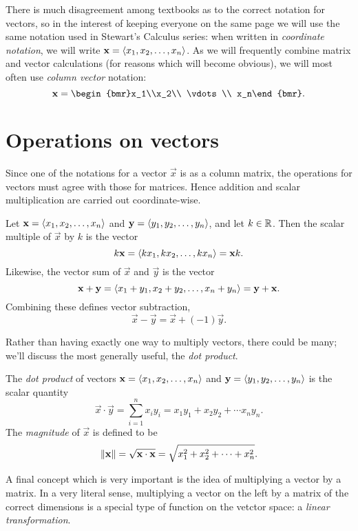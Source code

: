 \documentclass[m3380-lec-main.tex]{subfiles}
\begin{document}
There is much disagreement among textbooks as to the correct notation for vectors, so in the interest of keeping everyone on the same page we will use the same notation used in Stewart's Calculus series: when written in \emph{coordinate notation}, we will write ${\mathbf{x} = \left\langle x_1,x_2,\ldots,x_n\right\rangle}$. As we will frequently combine matrix and vector calculations (for reasons which will become obvious), we will most often use \emph{column vector} notation:
\[\vec{x} = \begin{bmr}x_1\\x_2\\ \vdots \\ x_n\end{bmr}. \]

\section{Operations on vectors}
Since one of the notations for a vector $\vec{x}$ is as a column matrix, the operations for vectors must agree with those for matrices. Hence addition and scalar multiplication are carried out coordinate-wise.

\begin{defn} Let $\mathbf{x}=\left\langle x_1,x_2,\ldots,x_n\right\rangle$ and $\mathbf{y}=\left\langle y_1,y_2,\ldots,y_n\right\rangle$, and let $k\in \mathbb{R}$. Then the scalar multiple of $\vec{x}$ by $k$ is the vector 
\[k\mathbf{x} = \left\langle kx_1,kx_2,\ldots,kx_n\right\rangle=\mathbf{x} k.\] 
Likewise, the vector sum of $\vec{x}$ and $\vec{y}$ is the vector
\[\mathbf{x}+\mathbf{y} = \left\langle x_1+y_1,x_2+y_2,\ldots,x_n+y_n\right\rangle=\mathbf{y}+\mathbf{x}.\]
Combining these defines vector subtraction, 
\[\vec{x}-\vec{y} = \vec{x}+(-1)\vec{y}.\]
\end{defn}

Rather than having exactly one way to multiply vectors, there could be many; we'll discuss the most generally useful, the \emph{dot product}.

\begin{defn} The \emph{dot product} of vectors $\mathbf{x}=\left\langle x_1,x_2,\ldots,x_n\right\rangle$ and $\mathbf{y}=\left\langle y_1,y_2,\ldots,y_n\right\rangle$ is the scalar quantity
\[\vec{x}\cdot\vec{y} = \sum_{i=1}^n x_iy_i = x_1y_1+x_2y_2+\cdots x_ny_n.\] The \emph{magnitude} of $\vec{x}$ is defined to be 
\[\left\lVert\mathbf{x}\right\rVert = \sqrt{\mathbf{x}\cdot\mathbf{x}} = \sqrt{x_1^2+x_2^2+\cdots+x_n^2}.\]
\end{defn}

A final concept which is very important is the idea of multiplying a vector by a matrix. In a very literal sense, multiplying a vector on the left by a matrix of the correct dimensions is a special type of function on the vetctor space: a \emph{linear transformation}.
\end{document}
